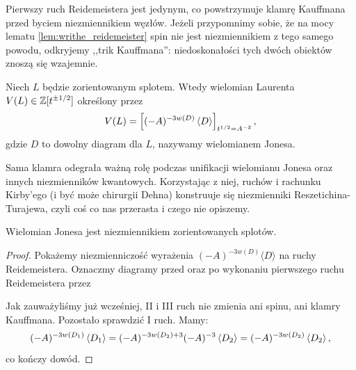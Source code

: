 Pierwszy ruch Reidemeistera jest jedynym, co powstrzymuje klamrę Kauffmana przed byciem niezmiennikiem węzłów.
Jeżeli przypomnimy sobie, że na mocy lematu \ref{lem:writhe_reidemeister} spin nie jest niezmiennikiem z tego samego powodu, odkryjemy ,,trik Kauffmana'': niedoskonałości tych dwóch obiektów znoszą się wzajemnie.
%
%

\begin{definition}
\label{def:jones_polynomial}%
    Niech $L$ będzie zorientowanym splotem.
    Wtedy wielomian Laurenta $V(L) \in \mathbb Z[t^{\pm 1/2}]$ określony przez
    \begin{equation}
        V(L)=\left[(-A)^{-3w(D)} \left\langle{D}\right\rangle\right]_{t^{1/2}=A^{-2}},
    \end{equation}
    gdzie $D$ to dowolny diagram dla $L$, nazywamy wielomianem Jonesa.
\end{definition}

Sama klamra odegrała ważną rolę podczas unifikacji wielomianu Jonesa oraz innych niezmienników kwantowych.
Korzystając z niej, ruchów i rachunku Kirby'ego (i być może chirurgii Dehna) konstruuje się niezmienniki Reszetichina-Turajewa, czyli coś co nas przerasta i czego nie opiszemy.
%
%
%
%
%
%

\begin{proposition}
    Wielomian Jonesa jest niezmiennikiem zorientowanych splotów.
\end{proposition}

\begin{proof}
    Pokażemy niezmienniczość wyrażenia $(-A)^{-3w(D)}\langle D\rangle$ na ruchy Reidemeistera.
    Oznaczmy diagramy przed oraz po wykonaniu pierwszego ruchu Reidemeistera przez

    Jak zauważyliśmy już wcześniej, II i III ruch nie zmienia ani spinu, ani klamry Kauffmana.
    Pozostało sprawdzić I ruch.
    Mamy:
    \begin{equation}
        (-A)^{-3 w\left(D_1\right)} \left\langle{D_1}\right\rangle =
        (-A)^{-3 w\left(D_2\right) + 3} (-A)^{-3}\left\langle{D_2}\right\rangle =
        (-A)^{-3 w\left(D_2\right)} \left\langle{D_2}\right\rangle,
    \end{equation}
    co kończy dowód.
\end{proof}

